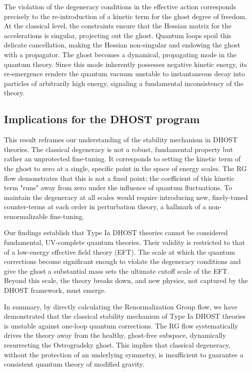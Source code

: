 \documentclass[twocolumn]{aastex631}
\begin{document}
The violation of the degeneracy conditions in the effective action corresponds precisely to the re-introduction of a kinetic term for the ghost degree of freedom. At the classical level, the constraints ensure that the Hessian matrix for the accelerations is singular, projecting out the ghost. Quantum loops spoil this delicate cancellation, making the Hessian non-singular and endowing the ghost with a propagator. The ghost becomes a dynamical, propagating mode in the quantum theory. Since this mode inherently possesses negative kinetic energy, its re-emergence renders the quantum vacuum unstable to instantaneous decay into particles of arbitrarily high energy, signaling a fundamental inconsistency of the theory.

\subsection{Implications for the DHOST program}

This result reframes our understanding of the stability mechanism in DHOST theories. The classical degeneracy is not a robust, fundamental property but rather an unprotected fine-tuning. It corresponds to setting the kinetic term of the ghost to zero at a single, specific point in the space of energy scales. The RG flow demonstrates that this is not a fixed point; the coefficient of this kinetic term "runs" away from zero under the influence of quantum fluctuations. To maintain the degeneracy at all scales would require introducing new, finely-tuned counter-terms at each order in perturbation theory, a hallmark of a non-renormalizable fine-tuning.

Our findings establish that Type Ia DHOST theories cannot be considered fundamental, UV-complete quantum theories. Their validity is restricted to that of a low-energy effective field theory (EFT). The scale at which the quantum corrections become significant enough to violate the degeneracy conditions and give the ghost a substantial mass sets the ultimate cutoff scale of the EFT. Beyond this scale, the theory breaks down, and new physics, not captured by the DHOST framework, must emerge.

In summary, by directly calculating the Renormalization Group flow, we have demonstrated that the classical stability mechanism of Type Ia DHOST theories is unstable against one-loop quantum corrections. The RG flow systematically drives the theory away from the healthy, ghost-free subspace, dynamically resurrecting the Ostrogradsky ghost. This implies that classical degeneracy, without the protection of an underlying symmetry, is insufficient to guarantee a consistent quantum theory of modified gravity.
\end{document}
